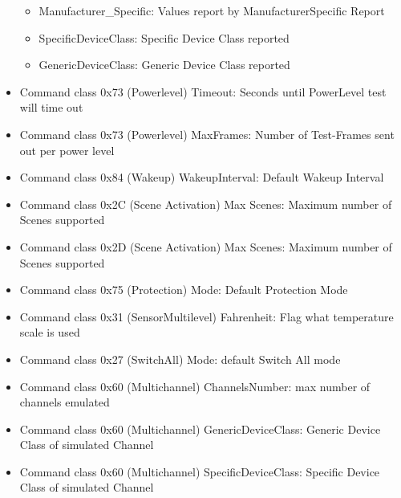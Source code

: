 \begin{itemize}
\begin{itemize}
\item Manufacturer_Specific: Values report by ManufacturerSpecific Report 
\item SpecificDeviceClass: Specific Device Class reported
\item GenericDeviceClass: Generic Device Class reported
\end{itemize} 
\item Command class 0x73 (Powerlevel) Timeout: Seconds until PowerLevel test will time out
\item Command class 0x73 (Powerlevel) MaxFrames: Number of Test-Frames sent out per power level 
\item Command class 0x84 (Wakeup) WakeupInterval: Default Wakeup Interval
\item Command class 0x2C (Scene Activation) Max Scenes: Maximum number of Scenes supported
\item Command class 0x2D (Scene Activation) Max Scenes: Maximum number of Scenes supported
\item Command class 0x75 (Protection) Mode: Default Protection Mode
\item Command class 0x31 (SensorMultilevel) Fahrenheit: Flag what temperature scale is used
\item Command class 0x27 (SwitchAll) Mode: default Switch All mode
\item Command class 0x60 (Multichannel) ChannelsNumber: max number of channels emulated
\item Command class 0x60 (Multichannel) GenericDeviceClass: Generic Device Class of simulated Channel
\item Command class 0x60 (Multichannel) SpecificDeviceClass: Specific Device Class of simulated Channel
\end{itemize} 
